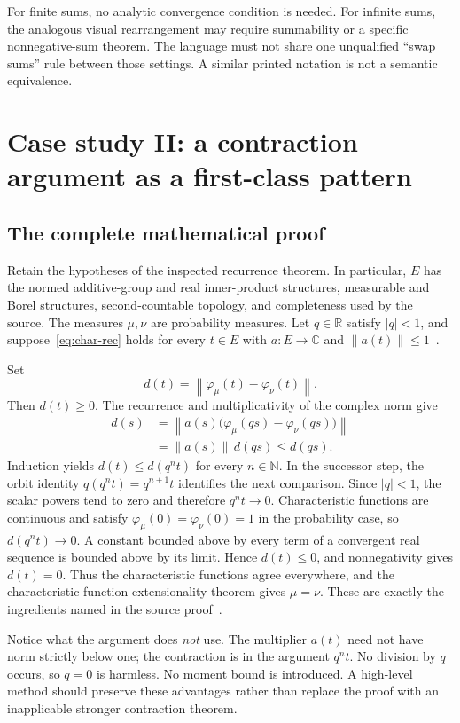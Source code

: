 \documentclass[11pt,letterpaper]{article}
\theoremstyle{definition}
\theoremstyle{remark}
\newcommand{\N}{\mathbb N}
\newcommand{\R}{\mathbb R}
\newcommand{\C}{\mathbb C}
\newcommand{\norm}[1]{\left\lVert#1\right\rVert}
\begin{document}
For finite sums, no analytic convergence condition is needed. For infinite sums, the analogous visual rearrangement may require summability or a specific nonnegative-sum theorem. The language must not share one unqualified ``swap sums'' rule between those settings. A similar printed notation is not a semantic equivalence.

\section{Case study II: a contraction argument as a first-class pattern}
\label{sec:contraction}
\subsection{The complete mathematical proof}
Retain the hypotheses of the inspected recurrence theorem. In particular, $E$ has the normed additive-group and real inner-product structures, measurable and Borel structures, second-countable topology, and completeness used by the source. The measures $\mu,\nu$ are probability measures. Let $q\in\R$ satisfy $|q|<1$, and suppose~\eqref{eq:char-rec} holds for every $t\in E$ with $a:E\to\C$ and $\norm{a(t)}\le1$~\cite{affine}.

Set
\[
 d(t)=\norm{\varphi_\mu(t)-\varphi_\nu(t)}.
\]
Then $d(t)\ge0$. The recurrence and multiplicativity of the complex norm give
\begin{align*}
 d(s)
 &=\norm{a(s)\bigl(\varphi_\mu(qs)-\varphi_\nu(qs)\bigr)}\\
 &=\norm{a(s)}\,d(qs)\le d(qs).
\end{align*}
Induction yields $d(t)\le d(q^nt)$ for every $n\in\N$. In the successor step, the orbit identity $q(q^nt)=q^{n+1}t$ identifies the next comparison. Since $|q|<1$, the scalar powers tend to zero and therefore $q^nt\to0$. Characteristic functions are continuous and satisfy $\varphi_\mu(0)=\varphi_\nu(0)=1$ in the probability case, so $d(q^nt)\to0$. A constant bounded above by every term of a convergent real sequence is bounded above by its limit. Hence $d(t)\le0$, and nonnegativity gives $d(t)=0$. Thus the characteristic functions agree everywhere, and the characteristic-function extensionality theorem gives $\mu=\nu$. These are exactly the ingredients named in the source proof~\cite{affine}.

Notice what the argument does \emph{not} use. The multiplier $a(t)$ need not have norm strictly below one; the contraction is in the argument $q^nt$. No division by $q$ occurs, so $q=0$ is harmless. No moment bound is introduced. A high-level method should preserve these advantages rather than replace the proof with an inapplicable stronger contraction theorem.
\end{document}
